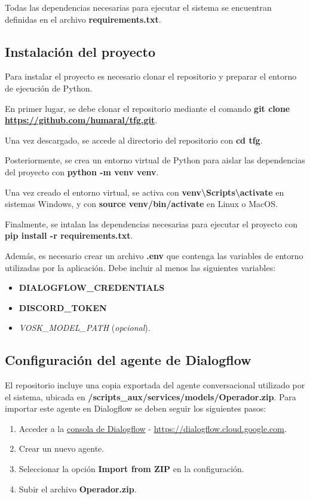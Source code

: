         Todas las dependencias necesarias para ejecutar el sistema se encuentran definidas en el archivo \textbf{requirements.txt}.

    \subsection{Instalación del proyecto}
        Para instalar el proyecto es necesario clonar el repositorio y preparar el entorno de ejecución de Python. 

        En primer lugar, se debe clonar el repositorio mediante el comando \textbf{git clone \url{https://github.com/humaral/tfg.git}}.
        
        Una vez descargado, se accede al directorio del repositorio con \textbf{cd tfg}. 
        
        Posteriormente, se crea un entorno virtual de Python para aislar las dependencias del proyecto con \textbf{python -m venv venv}.

        Una vez creado el entorno virtual, se activa con \textbf{venv\textbackslash{}Scripts\textbackslash{}activate} en sistemas Windows, y con \textbf{source venv/bin/activate} en Linux o MacOS. 

        Finalmente, se intalan las dependencias necesarias para ejecutar el proyecto con \textbf{pip install -r requirements.txt}.

        Además, es necesario crear un archivo \textbf{.env} que contenga las variables de entorno utilizadas por la aplicación. 
        Debe incluir al menos las siguientes variables:
        \begin{itemize}
            \item \textbf{DIALOGFLOW\_CREDENTIALS}
            \item \textbf{DISCORD\_TOKEN}
            \item \textit{VOSK\_MODEL\_PATH} (\textit{opcional}).
        \end{itemize}

    \subsection{Configuración del agente de Dialogflow}

        El repositorio incluye una copia exportada del agente conversacional utilizado por el sistema, ubicada en \textbf{/scripts\_aux/services/models/Operador.zip}.
        Para importar este agente en Dialogflow se deben seguir los siguientes pasos:
        \begin{enumerate}
            \item Acceder a la \href{https://dialogflow.cloud.google.com}{consola de Dialogflow} - \url{https://dialogflow.cloud.google.com}.
            \item Crear un nuevo agente.
            \item Seleccionar la opción \textbf{Import from ZIP} en la configuración.
            \item Subir el archivo \textbf{Operador.zip}.
        \end{enumerate}

